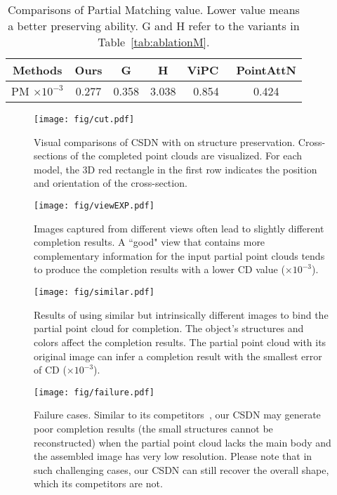 \begin{table}
\tiny
    \renewcommand\arraystretch{1.2}
        \centering
        \caption{Comparisons of Partial Matching value. Lower value means a better preserving ability. G and H refer to the variants in Table~\ref{tab:ablationM}.}
        \label{tab:ablationPM}
        \small
        \begin{tabular}{c|c|c|c|c|c}
        \hline
        Methods & Ours & G & H  & ViPC~\cite{zhang2021view} & PointAttN \cite{wang2022pointattn}\\
        \hline
        PM $\times 10^{-3}$ & 0.277 & 0.358 & 3.038 & 0.854 & 0.424 \\
        \hline
        \hline
        \end{tabular}
\end{table}
\begin{figure}[h]
  \centering
  \texttt{[image: fig/cut.pdf]}
  \caption{Visual comparisons of CSDN with \cite{zhang2021view,yu2021pointr} on structure preservation. Cross-sections of the completed point clouds are visualized. For each model, the 3D red rectangle in the first row indicates the position and orientation of the cross-section.}
  \label{fig:cut}
\end{figure} 
\begin{figure*}[h] 
  \centering
  \texttt{[image: fig/viewEXP.pdf]}
  \caption{Images captured from different views often lead to slightly different completion results. A ``good" view that contains more complementary information for the input partial point clouds tends to produce the completion results with a lower CD value ($\times10^{-3}$).}
  \label{fig:viewEXP}
\end{figure*}
\begin{figure*}[ht]
  \centering
  \texttt{[image: fig/similar.pdf]}
  \caption{Results of using similar but intrinsically different images to bind the partial point cloud for completion. The object's structures and colors affect the completion results. The partial point cloud with its original image can infer a completion result with the smallest error of CD ($\times10^{-3}$).}
  \label{fig:similar}
\end{figure*}
\begin{figure*}[!t] 
  \centering
  \texttt{[image: fig/failure.pdf]}
  \caption{Failure cases. Similar to its competitors~\cite{zhang2021view,yu2021pointr,zhou2022seedformer}, our CSDN may generate poor completion results (the small structures cannot be reconstructed) when the partial point cloud lacks the main body and the assembled image has very low resolution. Please note that in such challenging cases, our CSDN can still recover the overall shape, which its competitors are not.}
  \label{fig:failure}
\end{figure*}
